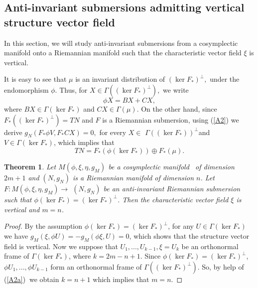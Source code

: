\documentclass{amsart}
\newtheorem{theorem}{Theorem}
\theoremstyle{plain}
\numberwithin{equation}{section}
\begin{document}
\subsection{\textbf{Anti-invariant submersions admitting vertical structure
vector field }}

In this section, we will study anti-invariant submersions from a
cosymplectic manifold onto a Riemannian manifold such that the
characteristic vector field $\xi $ is vertical.

It is easy to see that $\mu $ is an invariant distribution of $(\ker F_{\ast
})^{\bot },$ under the endomorphism $\phi $. Thus, for $X\in \Gamma ((\ker
F_{\ast })^{\bot }),$ we write\begin{equation}
\phi X=BX+CX,  \label{A2}
\end{equation}where $BX\in \Gamma (\ker F_{\ast })$ and $CX\in \Gamma (\mu ).$ On the
other hand, since $F_{\ast }((\ker F_{\ast })^{\bot })=TN$ and $F$ is a
Riemannian submersion, using (\ref{A2}) we derive $g_{N}(F_{\ast }\phi
V,F_{\ast }CX)=0,$ for every $X\in $ $\Gamma ((\ker F_{\ast }))^{\perp \text{
}}$and $V\in \Gamma (\ker F_{\ast })$, which implies that 
\begin{equation}
TN=F_{\ast }(\phi (\ker F_{\ast }))\oplus F_{\ast }(\mu ).  \label{A2a}
\end{equation}

\begin{theorem}
Let $M(\phi ,\xi ,\eta ,g_{M})$ be a cosymplectic manifold \ of dimension $2m+1$ and $(N,g_{N})$ is a Riemannian manifold of dimension $n$. Let $F:M(\phi ,\xi ,\eta ,g_{M})\rightarrow $ $(N,g_{N})$ be an anti-invariant
Riemannian submersion such that $\phi (\ker F_{\ast })=(\ker F_{\ast
})^{\bot }$. Then the characteristic vector field $\xi $ is vertical and $m=n $.
\end{theorem}

\begin{proof}
By the assumption $\phi (\ker F_{\ast })=(\ker F_{\ast })^{\bot }$, for any $U\in \Gamma (\ker F_{\ast })$ we have $g_{M}(\xi ,\phi U)=-g_{M}(\phi \xi
,U)=0$, which shows that the structure vector field is vertical. Now we
suppose that $U_{1},...,U_{k-1},\xi =U_{k}$ be an orthonormal frame of $\Gamma (\ker F_{\ast })$, where $k=2m-n+1$. Since $\phi (\ker F_{\ast
})=(\ker F_{\ast })^{\bot }$, $\phi U_{1},...,\phi U_{k-1}$ form an
orthonormal frame of $\Gamma ((\ker F_{\ast })^{\bot })$. So, by help of (\ref{A2a}) $\ $we obtain $k=n+1$ which implies that $m=n$.
\end{proof}
\end{document}

